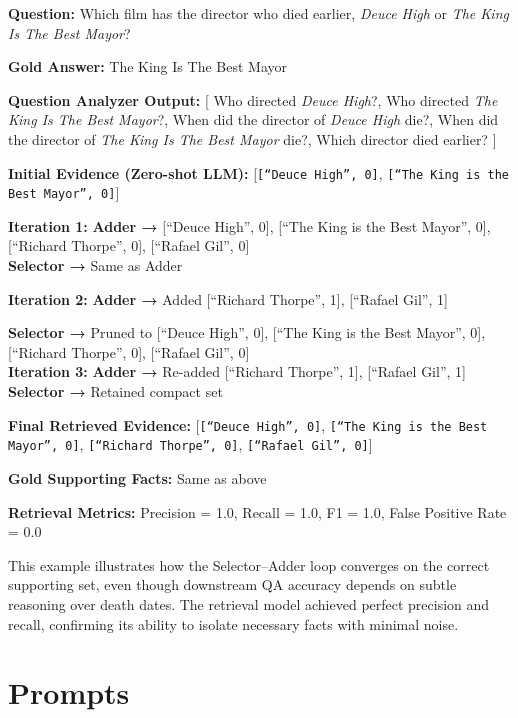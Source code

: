 \documentclass{article} %
\begin{document}
\begin{tcolorbox}[colback=gray!5,colframe=black!40,title=Example ID: e95acdbc085f11ebbd5dac1f6bf848b6]
\textbf{Question:} Which film has the director who died earlier, \emph{Deuce High} or \emph{The King Is The Best Mayor}?  

\textbf{Gold Answer:} The King Is The Best Mayor  

\medskip
\textbf{Question Analyzer Output:}
[ Who directed \emph{Deuce High}?, 
 Who directed \emph{The King Is The Best Mayor}?, 
When did the director of \emph{Deuce High} die?, 
When did the director of \emph{The King Is The Best Mayor} die?, 
Which director died earlier? ]


\textbf{Initial Evidence (Zero-shot LLM):}  
[\texttt{[``Deuce High'', 0]}, \texttt{[``The King is the Best Mayor'', 0]}]

\medskip
\textbf{Iteration 1:}  
\textbf{Adder →} [``Deuce High'', 0], [``The King is the Best Mayor'', 0], [``Richard Thorpe'', 0], [``Rafael Gil'', 0]  
\\ 
\textbf{Selector →} Same as Adder  

\textbf{Iteration 2:}  
\textbf{Adder →} Added [``Richard Thorpe'', 1], [``Rafael Gil'', 1]  

\textbf{Selector →} Pruned to [``Deuce High'', 0], [``The King is the Best Mayor'', 0], [``Richard Thorpe'', 0], [``Rafael Gil'', 0]  
\\
\textbf{Iteration 3:}  
\textbf{Adder →} Re-added [``Richard Thorpe'', 1], [``Rafael Gil'', 1]  
\\
\textbf{Selector →} Retained compact set  

\medskip
\textbf{Final Retrieved Evidence:}  
[\texttt{[``Deuce High'', 0]}, \texttt{[``The King is the Best Mayor'', 0]}, \texttt{[``Richard Thorpe'', 0]}, \texttt{[``Rafael Gil'', 0]}]  

\textbf{Gold Supporting Facts:} Same as above  

\medskip
\textbf{Retrieval Metrics:}  
Precision = 1.0, Recall = 1.0, F1 = 1.0, False Positive Rate = 0.0  

\end{tcolorbox}

This example illustrates how the Selector–Adder loop converges on the correct supporting set, even though downstream QA accuracy depends on subtle reasoning over death dates. The retrieval model achieved perfect precision and recall, confirming its ability to isolate necessary facts with minimal noise.
\newpage
\section{Prompts}
\label{app:prompts}
\end{document}
